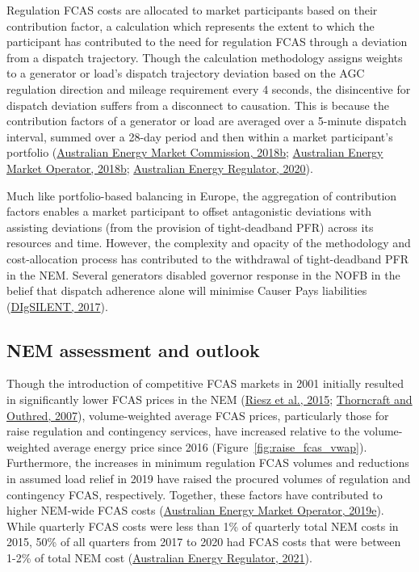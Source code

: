 \documentclass[12pt,a4paper,]{report}
\begin{document}
Regulation FCAS costs are allocated to market participants based on
their contribution factor, a calculation which represents the extent to
which the participant has contributed to the need for regulation FCAS
through a deviation from a dispatch trajectory. Though the calculation
methodology assigns weights to a generator or load's dispatch trajectory
deviation based on the AGC regulation direction and mileage requirement
every 4 seconds, the disincentive for dispatch deviation suffers from a
disconnect to causation. This is because the contribution factors of a
generator or load are averaged over a 5-minute dispatch interval, summed
over a 28-day period and then within a market participant's portfolio
(\protect\hyperlink{ref-australianenergymarketcommissionFrequencyControlFrameworks2018}{Australian
Energy Market Commission, 2018b};
\protect\hyperlink{ref-australianenergymarketoperatorRegulationFCASContribution2018a}{Australian
Energy Market Operator, 2018b};
\protect\hyperlink{ref-australianenergyregulatorIssuesPaperSemi2020}{Australian
Energy Regulator, 2020}).

Much like portfolio-based balancing in Europe, the aggregation of
contribution factors enables a market participant to offset antagonistic
deviations with assisting deviations (from the provision of
tight-deadband PFR) across its resources and time. However, the
complexity and opacity of the methodology and cost-allocation process
has contributed to the withdrawal of tight-deadband PFR in the NEM.
Several generators disabled governor response in the NOFB in the belief
that dispatch adherence alone will minimise Causer Pays liabilities
(\protect\hyperlink{ref-digsilentReviewFrequencyControl2017}{DIgSILENT,
2017}).

\hypertarget{nem-assessment-and-outlook}{%
\subsection{NEM assessment and
outlook}\label{nem-assessment-and-outlook}}

Though the introduction of competitive FCAS markets in 2001 initially
resulted in significantly lower FCAS prices in the NEM
(\protect\hyperlink{ref-rieszFrequencyControlAncillary2015}{Riesz et
al., 2015};
\protect\hyperlink{ref-thorncraftExperienceMarketbasedAncillary2007}{Thorncraft
and Outhred, 2007}), volume-weighted average FCAS prices, particularly
those for raise regulation and contingency services, have increased
relative to the volume-weighted average energy price since 2016
(Figure~\ref{fig:raise_fcas_vwap}). Furthermore, the increases in
minimum regulation FCAS volumes and reductions in assumed load relief in
2019 have raised the procured volumes of regulation and contingency
FCAS, respectively. Together, these factors have contributed to higher
NEM-wide FCAS costs
(\protect\hyperlink{ref-australianenergymarketoperatorReviewNEMLoad2019}{Australian
Energy Market Operator, 2019e}). While quarterly FCAS costs were less
than 1\% of quarterly total NEM costs in 2015, 50\% of all quarters from
2017 to 2020 had FCAS costs that were between 1-2\% of total NEM cost
(\protect\hyperlink{ref-australianenergyregulatorStateEnergyMarket2021}{Australian
Energy Regulator, 2021}).
\end{document}
